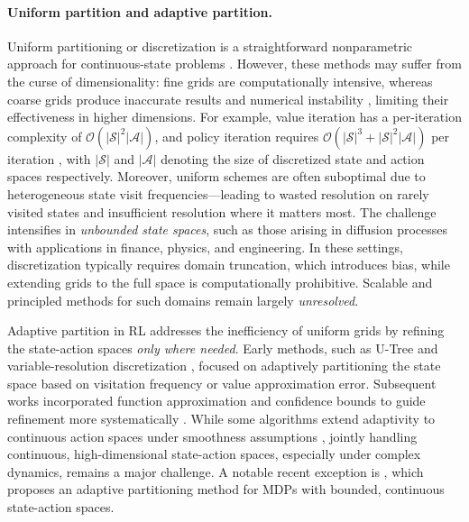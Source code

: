 \documentclass[final,supplement]{siamart251216}
\begin{document}
\paragraph{Uniform partition and adaptive partition.} Uniform partitioning or discretization is a straightforward nonparametric approach for continuous-state problems \cite{bayraktar2023approximate,kara2023q}. However, these methods may suffer from the curse of dimensionality: fine grids are computationally intensive, whereas coarse grids produce inaccurate results and numerical instability \cite{zhang2025state}, limiting their effectiveness in higher dimensions. For example, value iteration has a per-iteration complexity of $\mathcal{O}(|\mathcal{S}|^2|\mathcal{A}|)$, and policy iteration requires $\mathcal{O}(|\mathcal{S}|^3 + |\mathcal{S}|^2|\mathcal{A}|)$ per iteration \cite{puterman2014markov}, with $|\mathcal{S}|$ and $|\mathcal{A}|$ denoting the size of discretized state and action spaces respectively. Moreover, uniform schemes are often suboptimal due to heterogeneous state visit frequencies—leading to wasted resolution on rarely visited states and insufficient resolution where it matters most. The challenge intensifies in {\it unbounded state spaces}, such as those arising in diffusion processes with applications in finance, physics, and engineering. In these settings, discretization typically requires domain truncation, which introduces bias, while extending grids to the full space is computationally prohibitive. Scalable and principled methods for such domains remain largely {\it unresolved}.

Adaptive partition in RL addresses the inefficiency of uniform grids by refining the state-action spaces {\it only where needed}. Early methods, such as U-Tree \cite{mcCallum1996utree} and variable-resolution discretization \cite{munos2002variable}, focused on adaptively partitioning the state space based on visitation frequency or value approximation error. Subsequent works incorporated function approximation and confidence bounds to guide refinement more systematically \cite{strehl2006pac, munos2008finite, ortner2014regret}. While some algorithms extend adaptivity to continuous action spaces under smoothness assumptions \cite{pazis2013pac, dong2019provably}, jointly handling continuous, high-dimensional state-action spaces, especially under complex dynamics, remains a major challenge. A notable recent exception is \cite{sinclair2023adaptive}, which proposes an adaptive partitioning method for MDPs with bounded, continuous state-action spaces.
\end{document}
